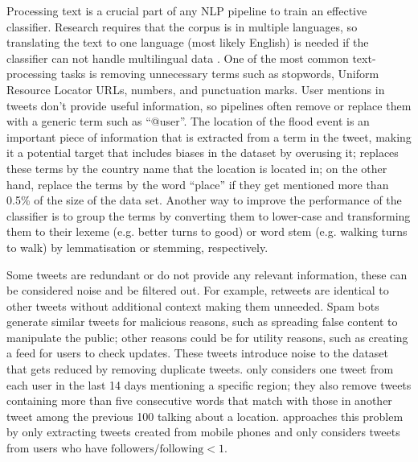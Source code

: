 Processing text is a crucial part of any \ac{NLP} pipeline to train an effective classifier.
Research requires that the corpus is in multiple languages, so translating the text to one language
(most likely English) is needed if the classifier can not handle multilingual data
\cite{singhEventClassificationLocation2019}. One of the most common text-processing tasks is
removing unnecessary terms such as stopwords, Uniform Resource Locator URLs, numbers, and
punctuation marks. User mentions in tweets don't provide useful information, so pipelines often
remove or replace them with a generic term such as
``@user''\cite{debruijnImprovingClassificationFlood2020}. The location of the flood event is an
important piece of information that is extracted from a term in the tweet, making it a potential
target that includes biases in the dataset by overusing it;
 replaces these terms by the country name that
the location is located in; on the other hand,
 replace the terms by the word ``place'' if
they get mentioned more than 0.5\% of the size of the data set. Another way to improve the
performance of the classifier is to group the terms by converting them to lower-case and
transforming them to their lexeme (e.g. better turns to good) or word stem (e.g. walking turns to walk) by lemmatisation\cite{petersenIdentificationExplorationExtreme2021} or stemming\cite{fengExtractionPluvialFlood2018}, respectively.

 Some tweets are redundant or do not provide any relevant information, these can be considered noise and be filtered out. For example, retweets are identical
to other tweets without additional context making them unneeded. Spam bots generate similar tweets
for malicious reasons, such as spreading false content to manipulate the public; other reasons could
be for utility reasons, such as creating a feed for users to check updates. These tweets introduce
noise to the dataset that gets reduced by removing duplicate tweets.
 only considers one tweet from each user in the last
14 days mentioning a specific region; they also remove tweets containing more than five consecutive
words that match with those in another tweet among the previous 100 talking about a location.
 approaches this problem by only extracting tweets
created from mobile phones and only considers tweets from users who have $\text{followers} /
\text{following} < 1$.

